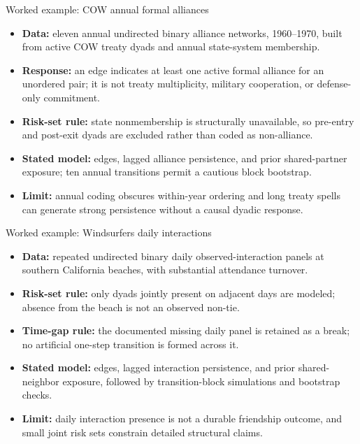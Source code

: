 \documentclass[aspectratio=169,11pt]{beamer}
\newcommand{\term}[1]{\textbf{\color{nupurple}#1}}
\begin{document}
\begin{frame}{Worked example: COW annual formal alliances}
\begin{itemize}
\item \term{Data:} eleven annual undirected binary alliance networks, 1960--1970, built from active COW treaty dyads and annual state-system membership.
\item \term{Response:} an edge indicates at least one active formal alliance for an unordered pair; it is not treaty multiplicity, military cooperation, or defense-only commitment.
\item \term{Risk-set rule:} state nonmembership is structurally unavailable, so pre-entry and post-exit dyads are excluded rather than coded as non-alliance.
\item \term{Stated model:} edges, lagged alliance persistence, and prior shared-partner exposure; ten annual transitions permit a cautious block bootstrap.
\item \term{Limit:} annual coding obscures within-year ordering and long treaty spells can generate strong persistence without a causal dyadic response.
\end{itemize}
\end{frame}

\begin{frame}{Worked example: Windsurfers daily interactions}
\begin{itemize}
\item \term{Data:} repeated undirected binary daily observed-interaction panels at southern California beaches, with substantial attendance turnover.
\item \term{Risk-set rule:} only dyads jointly present on adjacent days are modeled; absence from the beach is not an observed non-tie.
\item \term{Time-gap rule:} the documented missing daily panel is retained as a break; no artificial one-step transition is formed across it.
\item \term{Stated model:} edges, lagged interaction persistence, and prior shared-neighbor exposure, followed by transition-block simulations and bootstrap checks.
\item \term{Limit:} daily interaction presence is not a durable friendship outcome, and small joint risk sets constrain detailed structural claims.
\end{itemize}
\end{frame}
\end{document}
